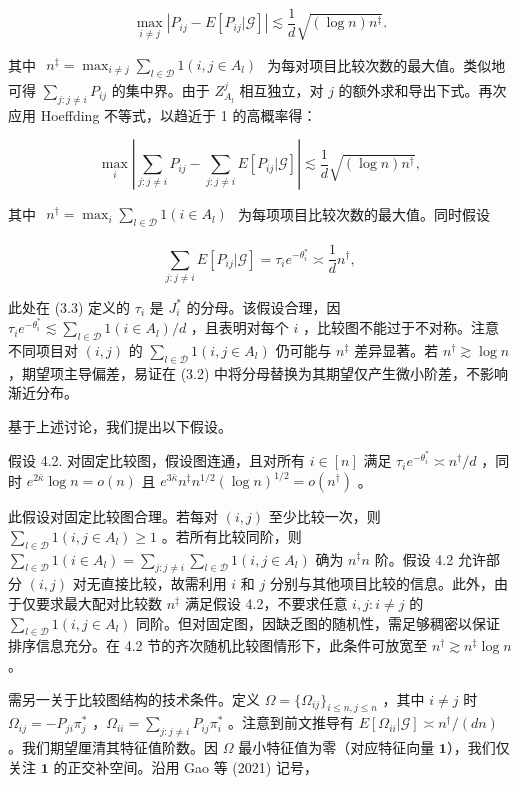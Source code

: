$$
\max_{i\neq j}\left|P_{ij} - E[P_{ij}|\mathcal{G}]\right|\lesssim \frac{1}{d}\sqrt{(\log n)n^{\ddagger}}.
$$

其中 $\begin{array}{r}{n^{\ddagger} = \max_{i\neq j}\sum_{l\in \mathcal{D}}1(i,j\in A_{l})} \end{array}$ 为每对项目比较次数的最大值。类似地可得 $\sum_{j:j\neq i}P_{ij}$ 的集中界。由于 $Z_{A_{l}}^{j}$ 相互独立，对 $j$ 的额外求和导出下式。再次应用 Hoeffding 不等式，以趋近于 1 的高概率得：

$$
\max_{i}\left|\sum_{j:j\neq i}P_{ij} - \sum_{j:j\neq i}E[P_{ij}|\mathcal{G}]\right|\lesssim \frac{1}{d}\sqrt{(\log n)n^{\dagger}},
$$

其中 $\begin{array}{r}{n^{\dagger} = \max_{i}\sum_{l\in \mathcal{D}}1(i\in A_{l})} \end{array}$ 为每项项目比较次数的最大值。同时假设

$$
\sum_{j:j\neq i}E[P_{ij}|\mathcal{G}] = \tau_{i}e^{-\theta_{i}^{*}}\asymp \frac{1}{d} n^{\dagger},
$$

此处在 (3.3) 定义的 $\tau_{i}$ 是 $J_{i}^{*}$ 的分母。该假设合理，因 $\tau_{i}e^{- \theta_{i}^{*}}\lesssim \sum_{l\in \mathcal{D}}1(i\in A_{l}) / d$ ，且表明对每个 $i$ ，比较图不能过于不对称。注意不同项目对 $(i,j)$ 的 $\sum_{l\in \mathcal{D}}1(i,j\in A_{l})$ 仍可能与 $n^{\ddagger}$ 差异显著。若 $n^{\dagger}\gtrsim \log n$ ，期望项主导偏差，易证在 (3.2) 中将分母替换为其期望仅产生微小阶差，不影响渐近分布。

基于上述讨论，我们提出以下假设。

假设 4.2. 对固定比较图，假设图连通，且对所有 $i\in [n]$ 满足 $\tau_{i}e^{- \theta_{i}^{*}}\asymp n^{\dagger} / d$ ，同时 $e^{2\bar{\kappa}}\log n = o(n)$ 且 $e^{3\bar{\kappa}}n^{\ddagger}n^{1 / 2}(\log n)^{1 / 2} = o(n^{\dagger})$ 。

此假设对固定比较图合理。若每对 $(i,j)$ 至少比较一次，则 $\sum_{l\in \mathcal{D}}1(i,j\in A_{l})\geq 1$ 。若所有比较同阶，则 $\sum_{l\in \mathcal{D}}1(i\in A_{l}) = \sum_{j:j\neq i}\sum_{l\in \mathcal{D}}1(i,j\in A_{l})$ 确为 $n^{\ddagger}n$ 阶。假设 4.2 允许部分 $(i,j)$ 对无直接比较，故需利用 $i$ 和 $j$ 分别与其他项目比较的信息。此外，由于仅要求最大配对比较数 $n^{\ddagger}$ 满足假设 4.2，不要求任意 $i,j:i\neq j$ 的 $\sum_{l\in \mathcal{D}}1(i,j\in A_l)$ 同阶。但对固定图，因缺乏图的随机性，需足够稠密以保证排序信息充分。在 4.2 节的齐次随机比较图情形下，此条件可放宽至 $n^{\dagger}\gtrsim n^{\ddagger}\log n$ 。

需另一关于比较图结构的技术条件。定义 $\Omega = \{\Omega_{ij}\}_{i\leq n,j\leq n}$ ，其中 $i\neq j$ 时 $\Omega_{ij} = - P_{ji}\pi_j^*$ ，$\Omega_{ii} = \sum_{j:j\neq i}P_{ij}\pi_i^*$ 。注意到前文推导有 $E[\Omega_{ii}|\mathcal{G}]\asymp n^{\dagger}/(dn)$ 。我们期望厘清其特征值阶数。因 $\Omega$ 最小特征值为零（对应特征向量 $\mathbf{1}$），我们仅关注 $\mathbf{1}$ 的正交补空间。沿用 Gao 等 (2021) 记号，

